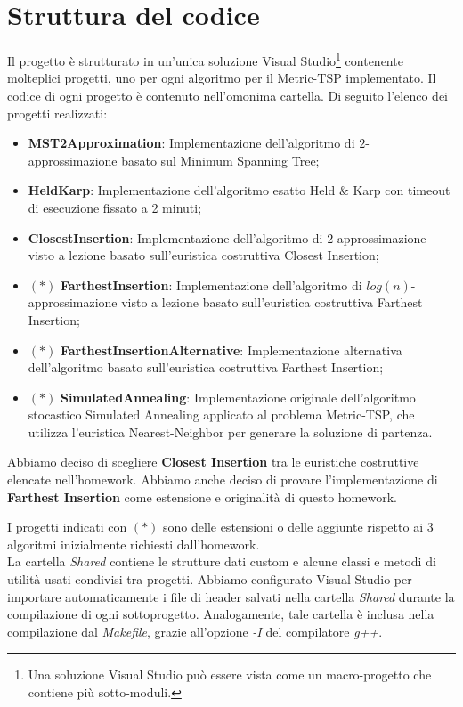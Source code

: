 \section{Struttura del codice}
\label{cap:code-structure}

Il progetto è strutturato in un'unica soluzione Visual Studio\footnote{Una soluzione Visual Studio può essere vista come un macro-progetto che contiene più sotto-moduli.} contenente molteplici progetti, uno per ogni algoritmo per il Metric-TSP implementato. Il codice di ogni progetto è contenuto nell'omonima cartella. Di seguito l'elenco dei progetti realizzati:

\begin{itemize}
    \item \textbf{MST2Approximation}: Implementazione dell'algoritmo di $2$-approssimazione basato sul Minimum Spanning Tree;
    \item \textbf{HeldKarp}: Implementazione dell'algoritmo esatto Held \& Karp con timeout di esecuzione fissato a 2 minuti;
    \item \textbf{ClosestInsertion}: Implementazione dell'algoritmo di $2$-approssimazione visto a lezione basato sull'euristica costruttiva Closest Insertion;
    \item $(*)$ \textbf{FarthestInsertion}: Implementazione dell'algoritmo di $log(n)$-approssimazione visto a lezione basato sull'euristica costruttiva Farthest Insertion;
    \item $(*)$ \textbf{FarthestInsertionAlternative}: Implementazione alternativa dell'algoritmo basato sull'euristica costruttiva Farthest Insertion;
    \item $(*)$ \textbf{SimulatedAnnealing}: Implementazione originale dell'algoritmo stocastico Simulated Annealing applicato al problema Metric-TSP, che utilizza l'euristica Nearest-Neighbor per generare la soluzione di partenza.
\end{itemize}

\noindent Abbiamo deciso di scegliere \textbf{Closest Insertion} tra le euristiche costruttive elencate nell'homework. Abbiamo anche deciso di provare l'implementazione di \textbf{Farthest Insertion} come estensione e originalità di questo homework.

\noindent I progetti indicati con $(*)$ sono delle estensioni o delle aggiunte rispetto ai 3 algoritmi inizialmente richiesti dall'homework.
\\

\noindent La cartella \textit{Shared} contiene le strutture dati custom e alcune classi e metodi di utilità usati
condivisi tra progetti. Abbiamo configurato Visual Studio per importare automaticamente i file di header salvati nella cartella \textit{Shared}
durante la compilazione di ogni sottoprogetto. Analogamente, tale cartella è inclusa nella compilazione dal \textit{Makefile}, grazie all'opzione \textit{-I} del compilatore \textit{g++}.

